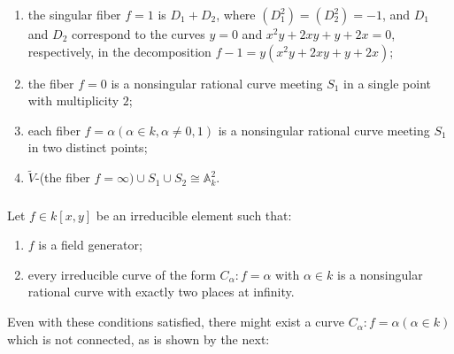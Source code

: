 \begin{example*}
\begin{enumerate}
\item the singular fiber $f=1$ is $D_{1}+D_{2}$, where
  $(D^{2}_{1})=(D^{2}_{2})=-1$, and $D_{1}$ and $D_{2}$ correspond to
  the curves $y=0$ and $x^{2}y+2xy+y+2x=0$, respectively, in the
  decomposition $f-1=y(x^{2}y+2xy+y+2x)$;

\item the fiber $f=0$ is a nonsingular rational curve meeting $S_{1}$
  in a single point with multiplicity $2$;

\item each fiber $f=\alpha(\alpha\in k,\alpha\neq 0,1)$ is a
  nonsingular rational curve meeting $S_{1}$ in two distinct points;

\item $\widetilde{V}$-(the fiber $f=\infty)\cup S_{1}\cup S_{2}\cong
  \mathbb{A}^{2}_{k}$. 
\end{enumerate}
\end{example*}

\subsubsection{}\label{chap2:2.4.5}
Let $f\in k[x,y]$ be an irreducible element such that:
\begin{enumerate}
\renewcommand{\labelenumi}{(\theenumi)}
\item $f$ is a field generator;

\item every irreducible curve of the form $C_{\alpha}:f=\alpha$ with
  $\alpha\in k$ is a nonsingular rational curve with exactly two
  places at infinity.
\end{enumerate}

Even with these conditions satisfied, there might exist a curve
$C_{\alpha}:f=\alpha(\alpha\in k)$ which is not connected, as is shown
by the next:


